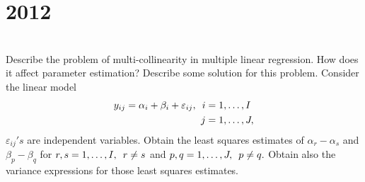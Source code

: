 \section*{2012}
\vspace{-.5cm}
\hrulefill \smallskip\\
 Describe the problem of multi-collinearity in multiple linear regression. How does it affect parameter estimation? Describe some solution for this problem.
\myline
{} Consider the linear model
\[
\begin{aligned}
y_{ij} = \alpha_i + \beta_i + \varepsilon_{ij}, 
    \enskip i &= 1,\dotsc,I\\
            j&=  1,\dotsc,J,    
\end{aligned} \]
$\varepsilon_{ij}'s$ are independent \nml variables. Obtain the least squares estimates of $\alpha_r - \alpha_s$ and $\beta_p - \beta_q$ for $r,s = 1,\dotsc,I, \enskip r\neq s$ and $p,q =1,\dotsc,J, \enskip p\neq q .$ Obtain also the variance expressions for those least squares estimates.